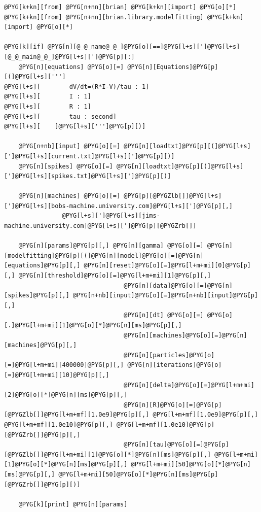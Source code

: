 \documentclass[letterpaper,10pt,english]{manual}
\begin{document}
\begin{Verbatim}[commandchars=@\[\]]
@PYG[k+kn][from] @PYG[n+nn][brian] @PYG[k+kn][import] @PYG[o][*]
@PYG[k+kn][from] @PYG[n+nn][brian.library.modelfitting] @PYG[k+kn][import] @PYG[o][*]

@PYG[k][if] @PYG[n][@_@_name@_@_]@PYG[o][==]@PYG[l+s][']@PYG[l+s][@_@_main@_@_]@PYG[l+s][']@PYG[p][:]
    @PYG[n][equations] @PYG[o][=] @PYG[n][Equations]@PYG[p][(]@PYG[l+s][''']
@PYG[l+s][        dV/dt=(R*I-V)/tau : 1]
@PYG[l+s][        I : 1]
@PYG[l+s][        R : 1]
@PYG[l+s][        tau : second]
@PYG[l+s][    ]@PYG[l+s][''']@PYG[p][)]

    @PYG[n+nb][input] @PYG[o][=] @PYG[n][loadtxt]@PYG[p][(]@PYG[l+s][']@PYG[l+s][current.txt]@PYG[l+s][']@PYG[p][)]
    @PYG[n][spikes] @PYG[o][=] @PYG[n][loadtxt]@PYG[p][(]@PYG[l+s][']@PYG[l+s][spikes.txt]@PYG[l+s][']@PYG[p][)]

    @PYG[n][machines] @PYG[o][=] @PYG[p][@PYGZlb[]]@PYG[l+s][']@PYG[l+s][bobs-machine.university.com]@PYG[l+s][']@PYG[p][,]
                @PYG[l+s][']@PYG[l+s][jims-machine.university.com]@PYG[l+s][']@PYG[p][@PYGZrb[]]

    @PYG[n][params]@PYG[p][,] @PYG[n][gamma] @PYG[o][=] @PYG[n][modelfitting]@PYG[p][(]@PYG[n][model]@PYG[o][=]@PYG[n][equations]@PYG[p][,] @PYG[n][reset]@PYG[o][=]@PYG[l+m+mi][0]@PYG[p][,] @PYG[n][threshold]@PYG[o][=]@PYG[l+m+mi][1]@PYG[p][,]
                                 @PYG[n][data]@PYG[o][=]@PYG[n][spikes]@PYG[p][,] @PYG[n+nb][input]@PYG[o][=]@PYG[n+nb][input]@PYG[p][,]
                                 @PYG[n][dt] @PYG[o][=] @PYG[o][.]@PYG[l+m+mi][1]@PYG[o][*]@PYG[n][ms]@PYG[p][,]
                                 @PYG[n][machines]@PYG[o][=]@PYG[n][machines]@PYG[p][,]
                                 @PYG[n][particles]@PYG[o][=]@PYG[l+m+mi][400000]@PYG[p][,] @PYG[n][iterations]@PYG[o][=]@PYG[l+m+mi][10]@PYG[p][,]
                                 @PYG[n][delta]@PYG[o][=]@PYG[l+m+mi][2]@PYG[o][*]@PYG[n][ms]@PYG[p][,]
                                 @PYG[n][R]@PYG[o][=]@PYG[p][@PYGZlb[]]@PYG[l+m+mf][1.0e9]@PYG[p][,] @PYG[l+m+mf][1.0e9]@PYG[p][,] @PYG[l+m+mf][1.0e10]@PYG[p][,] @PYG[l+m+mf][1.0e10]@PYG[p][@PYGZrb[]]@PYG[p][,]
                                 @PYG[n][tau]@PYG[o][=]@PYG[p][@PYGZlb[]]@PYG[l+m+mi][1]@PYG[o][*]@PYG[n][ms]@PYG[p][,] @PYG[l+m+mi][1]@PYG[o][*]@PYG[n][ms]@PYG[p][,] @PYG[l+m+mi][50]@PYG[o][*]@PYG[n][ms]@PYG[p][,] @PYG[l+m+mi][50]@PYG[o][*]@PYG[n][ms]@PYG[p][@PYGZrb[]]@PYG[p][)]

    @PYG[k][print] @PYG[n][params]
\end{Verbatim}
\end{document}
